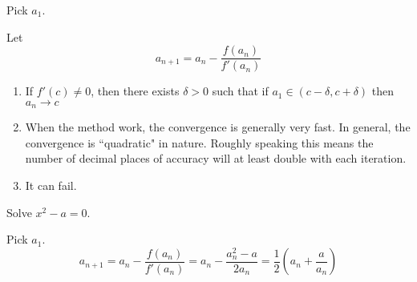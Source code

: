 \begin{thm}
Pick $a_1$.

Let \[a_{n+1} = a_n - \frac{f(a_n)}{f'(a_n)}\]
\end{thm}

\begin{rem}\leavevmode

\begin{enumerate}
\item If $f'(c)\neq 0$, then there exists $\delta > 0$ such that if $a_1 \in (c-\delta,c+\delta)$ then $a_n \to c$
\item When the method work, the convergence is generally very fast. In general, the convergence is ``quadratic" in nature. Roughly speaking this means the number of decimal places of accuracy will at least double with each iteration.
\item It can fail.
\end{enumerate}
\end{rem}

\begin{exmp}
Solve $x^2 - a = 0$.
\end{exmp}

\begin{solution}
Pick $a_1$. \[a_{n+1} = a_{n} - \frac{f(a_n)}{f'(a_n)} = a_n - \frac{a^2_n - a}{2a_n} = \frac{1}{2} (a_n + \frac{a}{a_n})\]
\end{solution}